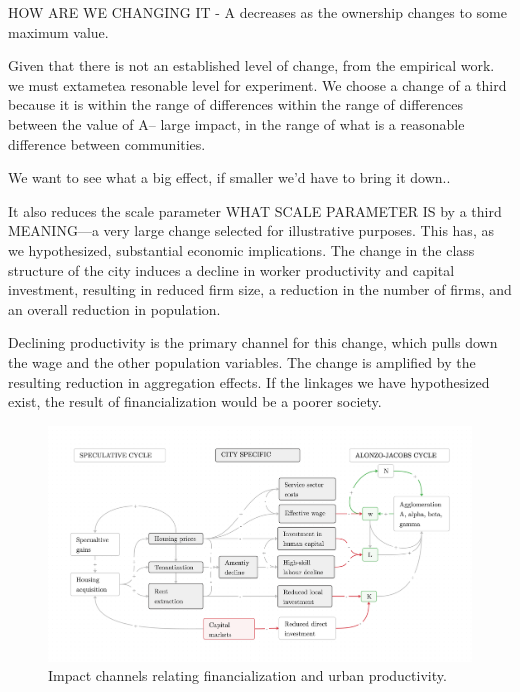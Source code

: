 HOW ARE WE CHANGING IT - A decreases as the ownership changes to some maximum value. 

Given that there is not an established level of change, from the empirical work. we must extametea resonable level for experiment. We choose a change of a third because it is within the range of differences within the range of differences between the value of A--
large impact, in the range of what is a reasonable difference between communities.

We want to see what a big effect, if smaller we'd have to bring it down..

It also reduces the scale parameter {\color{red}WHAT SCALE PARAMETER IS} by a third MEANING---a very large change selected for illustrative purposes. This has, as we hypothesized, substantial economic implications. The change in the class structure of the city induces a decline in worker productivity and capital investment, resulting in reduced firm size, a reduction in the number of firms, and an overall reduction in population. 

Declining productivity is the primary channel for this change, which pulls down the wage and the other population variables. The change is amplified by the resulting reduction in aggregation effects.  If the linkages we have hypothesized exist, the result of financialization would be a poorer society. 


\begin{figure}[h!tb]\label{fig-impact-channels2}
\begin{adjustwidth}{-0.24\textwidth}{-0.24\textwidth}
\centering
\includegraphics[scale=.15 ]{fig/impact-channels.png}%
\end{adjustwidth}
\caption{Impact channels relating financialization and urban productivity.}
\end{figure}

